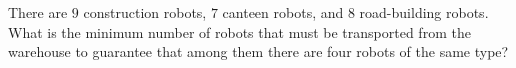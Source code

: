 There are $9$ construction robots, $7$ canteen robots, and $8$ road-building robots. What is the minimum number of robots that must be transported from the warehouse to guarantee that among them there are four robots of the same type?
